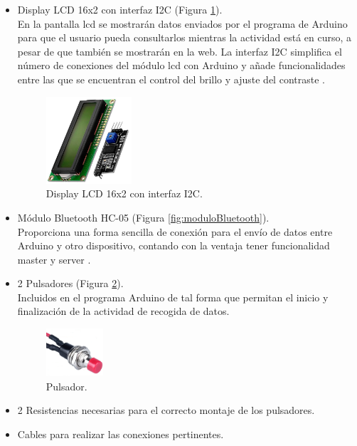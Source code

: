 \begin{itemize}
    \item Display LCD 16x2 con interfaz I2C (Figura \ref{fig:lcd}). \\
    En la pantalla lcd se mostrarán datos enviados por el programa de Arduino para que el usuario pueda consultarlos mientras la actividad está en curso, a pesar de que también se mostrarán en la web. La interfaz I2C simplifica el número de conexiones del módulo lcd con Arduino y añade funcionalidades entre las que se encuentran el control del brillo y ajuste del contraste \cite{16x2LCDd27:online}.
    
    \begin{figure}[h]
        \centering
        \includegraphics[width=0.3\textwidth]{img/4.TecnicasHerramientas/LCDI2C.png}
        \caption{Display LCD 16x2 con interfaz I2C. \cite{lcdFoto88:online}}
        \label{fig:lcd}
    \end{figure}

    \item Módulo Bluetooth HC-05 (Figura \ref{fig:moduloBluetooth}). \\
    Proporciona una forma sencilla de conexión para el envío de datos entre Arduino y otro dispositivo, contando con la ventaja tener funcionalidad master y server \cite{Conectar13:online}.
    
    \item 2 Pulsadores (Figura \ref{fig:pulsador}). \\
    Incluidos en el programa Arduino de tal forma que permitan el inicio y finalización de la actividad de recogida de datos.
    
    \begin{figure}[h]
        \centering
        \includegraphics[width=0.2\textwidth]{img/4.TecnicasHerramientas/Pulsador.png}
        \caption{Pulsador. \cite{Pulsador32:online}}
        \label{fig:pulsador}
    \end{figure}
    
    \item 2 Resistencias necesarias para el correcto montaje de los pulsadores.
    
    \item Cables para realizar las conexiones pertinentes.
\end{itemize}

